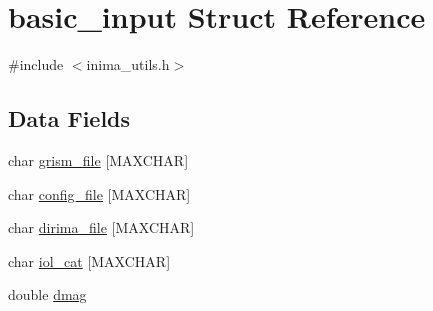 \hypertarget{structbasic__input}{
\section{basic\_\-input Struct Reference}
\label{structbasic__input}
}


{\ttfamily \#include $<$inima\_\-utils.h$>$}\subsection*{Data Fields}
\begin{DoxyCompactItemize}
\item 
char \hyperlink{structbasic__input_a051fdba94c858cc9fb7e8fc53aa0cef3}{grism\_\-file} \mbox{[}MAXCHAR\mbox{]}
\item 
char \hyperlink{structbasic__input_ae727f03bb293ff762d591d577d08f9c4}{config\_\-file} \mbox{[}MAXCHAR\mbox{]}
\item 
char \hyperlink{structbasic__input_a7abc1ca0b2f0e2baa263a5cd29015ded}{dirima\_\-file} \mbox{[}MAXCHAR\mbox{]}
\item 
char \hyperlink{structbasic__input_aa59577abc77308875fd9a0e102a2bbb2}{iol\_\-cat} \mbox{[}MAXCHAR\mbox{]}
\item 
double \hyperlink{structbasic__input_af35e90aa0f78ac5e17303fcd332f1423}{dmag}
\end{DoxyCompactItemize}



